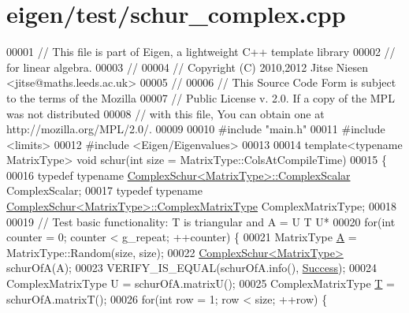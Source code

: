 \hypertarget{eigen_2test_2schur__complex_8cpp_source}{}\section{eigen/test/schur\+\_\+complex.cpp}
\label{eigen_2test_2schur__complex_8cpp_source}

\begin{DoxyCode}
00001 \textcolor{comment}{// This file is part of Eigen, a lightweight C++ template library}
00002 \textcolor{comment}{// for linear algebra.}
00003 \textcolor{comment}{//}
00004 \textcolor{comment}{// Copyright (C) 2010,2012 Jitse Niesen <jitse@maths.leeds.ac.uk>}
00005 \textcolor{comment}{//}
00006 \textcolor{comment}{// This Source Code Form is subject to the terms of the Mozilla}
00007 \textcolor{comment}{// Public License v. 2.0. If a copy of the MPL was not distributed}
00008 \textcolor{comment}{// with this file, You can obtain one at http://mozilla.org/MPL/2.0/.}
00009 
00010 \textcolor{preprocessor}{#include "main.h"}
00011 \textcolor{preprocessor}{#include <limits>}
00012 \textcolor{preprocessor}{#include <Eigen/Eigenvalues>}
00013 
00014 \textcolor{keyword}{template}<\textcolor{keyword}{typename} MatrixType> \textcolor{keywordtype}{void} schur(\textcolor{keywordtype}{int} size = MatrixType::ColsAtCompileTime)
00015 \{
00016   \textcolor{keyword}{typedef} \textcolor{keyword}{typename} \hyperlink{group___eigenvalues___module_class_eigen_1_1_complex_schur}{ComplexSchur<MatrixType>::ComplexScalar} 
      ComplexScalar;
00017   \textcolor{keyword}{typedef} \textcolor{keyword}{typename} \hyperlink{group___eigenvalues___module_class_eigen_1_1_complex_schur}{ComplexSchur<MatrixType>::ComplexMatrixType} 
      ComplexMatrixType;
00018 
00019   \textcolor{comment}{// Test basic functionality: T is triangular and A = U T U*}
00020   \textcolor{keywordflow}{for}(\textcolor{keywordtype}{int} counter = 0; counter < g\_repeat; ++counter) \{
00021     MatrixType \hyperlink{group___core___module_class_eigen_1_1_matrix}{A} = MatrixType::Random(size, size);
00022     \hyperlink{group___eigenvalues___module}{ComplexSchur<MatrixType>} schurOfA(A);
00023     VERIFY\_IS\_EQUAL(schurOfA.info(), \hyperlink{group__enums_gga85fad7b87587764e5cf6b513a9e0ee5ea52581b035f4b59c203b8ff999ef5fcea}{Success});
00024     ComplexMatrixType U = schurOfA.matrixU();
00025     ComplexMatrixType \hyperlink{group___sparse_core___module}{T} = schurOfA.matrixT();
00026     \textcolor{keywordflow}{for}(\textcolor{keywordtype}{int} row = 1; row < size; ++row) \{

\end{DoxyCode}

